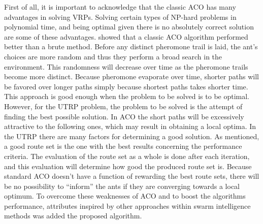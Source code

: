 First of all, it is important to acknowledge that the classic ACO has many advantages in solving VRPs. Solving certain types of NP-hard problems in polynomial time, and being optimal given there is no absolutely correct solution are some of these advantages. \citet{hsiao04} showed that a classic ACO algorithm performed better than a brute method. Before any distinct pheromone trail is laid, the ant's choices are more random and thus they perform a broad search in the environment. This randomness will decrease over time as the pheromone trails become more distinct. Because pheromone evaporate over time, shorter paths will be favored over longer paths simply because shortest paths takes shorter time. This approach is good enough when the problem to be solved is to be optimal. However, for the UTRP problem, the problem to be solved is the attempt of finding the best possible solution. In ACO the short paths will be excessively attractive to the following ones, which may result in obtaining a local optima. In the UTRP there are many factors for determining a good solution. As mentioned, a good route set is the one with the best results concerning the performance criteria. The evaluation of the route set as a whole is done after each iteration, and this evaluation will determine how good the produced route set is. Because standard ACO doesn't have a function of rewarding the best route sets, there will be no possibility to ``inform'' the ants if they are converging towards a local optimum. To overcome these weaknesses of ACO and to boost the algorithms performance, attributes inspired by other approaches within swarm intelligence methods was added the proposed algorithm. %

